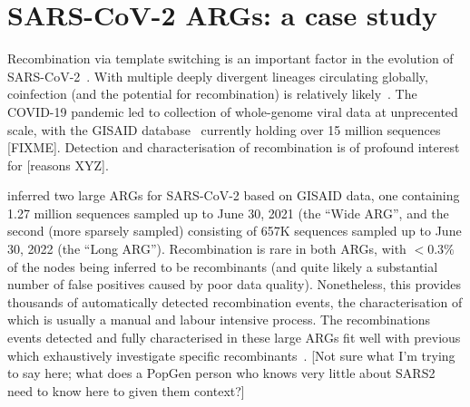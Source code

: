 \documentclass{article}
\begin{document}
\section*{SARS-CoV-2 ARGs: a case study}
Recombination via template switching is an important
factor in the evolution of
SARS-CoV-2~\citep{vaninsberghe2021recombinant,jackson2021generation,ignatieva2022ongoing}.
With multiple deeply divergent lineages circulating globally,
coinfection (and the potential for recombination)
is relatively likely~\citep{bal2022detection}.
The COVID-19 pandemic led to collection of whole-genome viral data
at unprecented scale, with the GISAID database~\citep{shu2017gisaid}
currently holding over 15 million sequences [FIXME]. Detection
and characterisation of recombination is of profound interest
for [reasons XYZ].

\citet{zhan2023towards} inferred two large ARGs for SARS-CoV-2 based
on GISAID data, one containing 1.27 million sequences sampled up to
June 30, 2021 (the ``Wide ARG'', and the second
(more sparsely sampled) consisting of 657K sequences sampled up to June 30,
2022 (the ``Long ARG''). Recombination is rare in both ARGs, with $<0.3\%$
of the nodes being inferred to be recombinants (and quite likely
a substantial number of false positives caused by poor data quality).
Nonetheless, this provides thousands of automatically detected
recombination events, the characterisation of which is usually a manual
and labour intensive process. The recombinations events detected
and fully characterised in these large ARGs fit well with previous
which exhaustively investigate specific
recombinants~\citep{jackson2021generation}.
[Not sure what I'm trying to say here;
what does a PopGen person who knows very little about SARS2 need to
know here to given them context?]
\end{document}
